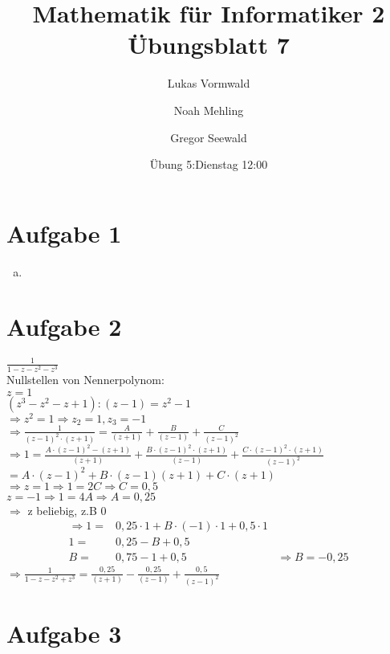 \documentclass[11pt,a4paper]{article}
\title{Mathematik für Informatiker 2\\Übungsblatt 7}
\author{Lukas Vormwald \and Noah Mehling \and Gregor Seewald}
\date{Übung 5:Dienstag 12:00}
\begin{document}
  \section*{Aufgabe 1}

    \begin{enumerate}[a)]
      \item
    \end{enumerate}

  \section*{Aufgabe 2}

    $\frac{1}{1-z-z^2-z^3}$\\
    Nullstellen von Nennerpolynom:\\
    $z=1$\\
    $(z^3-z^2-z+1) : (z-1)=z^2-1$\\
    $\Rightarrow z^2=1 \Rightarrow z_2=1,z_3=-1$\\
    $\Rightarrow \frac{1}{\left(z-1\right)^2\cdot\left(z+1\right)}=\frac{A}{\left(z+1\right)}+\frac{B}{\left(z-1\right)}+\frac{C}{\left(z-1\right)^2}$\\
    $\Rightarrow 1=\frac{A\cdot \left(z-1\right)^2-\left(z+1\right)}{\left(z+1\right)}+\frac{B\cdot \left(z-1\right)^2\cdot \left(z+1\right)}{\left(z-1\right)}+\frac{C\cdot \left(z-1\right)^2\cdot\left(z+1\right)}{\left(z-1\right)^2}$\\
    $=A\cdot \left(z-1\right)^2+B\cdot\left(z-1\right)\left(z+1\right)+C\cdot\left(z+1\right)$\\
    $\Rightarrow z=1 \Rightarrow 1=2C \Rightarrow C=0,5$\\
    $z=-1 \Rightarrow 1=4A \Rightarrow A=0,25$\\
    $\Rightarrow$ z beliebig, z.B $0$
    \begin{align*}
      \Rightarrow 1 =& 0,25 \cdot 1 + B \cdot \left( -1 \right) \cdot 1 + 0,5 \cdot 1\\
      1 =& 0,25 - B + 0,5\\
      B =& 0,75 - 1 + 0,5 &\Rightarrow B = -0,25
    \end{align*}
    $\Rightarrow \frac{1}{1-z-z^2+z^3} = \frac{0,25}{\left(z+1\right)} - \frac{0,25}{\left(z-1\right)}+ \frac{0,5}{\left(z-1\right)^2}$

  \section*{Aufgabe 3}
\end{document}

